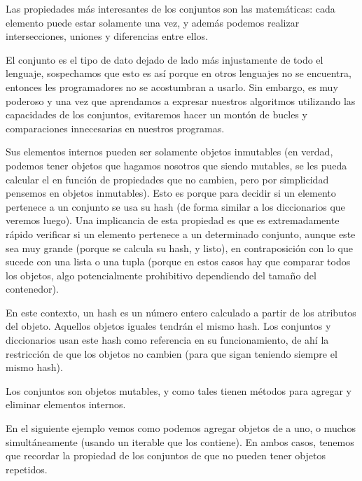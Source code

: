 Las propiedades más interesantes de los conjuntos son las matemáticas: cada elemento puede estar solamente una vez, y además podemos realizar intersecciones, uniones y diferencias entre ellos.


El conjunto es el tipo de dato dejado de lado más injustamente de todo el lenguaje, sospechamos que esto es así porque en otros lenguajes no se encuentra, entonces les programadores no se acostumbran a usarlo. Sin embargo, es muy poderoso y una vez que aprendamos a expresar nuestros algoritmos utilizando las capacidades de los conjuntos, evitaremos hacer un montón de bucles y comparaciones innecesarias en nuestros programas.

Sus elementos internos pueden ser solamente objetos inmutables (en verdad, podemos tener objetos que hagamos nosotros que siendo mutables, se les pueda calcular el  en función de propiedades que no cambien, pero por simplicidad pensemos en objetos inmutables). Esto es porque para decidir si un elemento pertenece a un conjunto se usa su hash (de forma similar a los diccionarios que veremos luego). Una implicancia de esta propiedad es que es extremadamente rápido verificar si un elemento pertenece a un determinado conjunto, aunque este sea muy grande (porque se calcula su hash, y listo), en contraposición con lo que sucede con una lista o una tupla (porque en estos casos hay que comparar todos los objetos, algo potencialmente prohibitivo dependiendo del tamaño del contenedor).

\begin{info}
En este contexto, un hash es un número entero calculado a partir de los atributos del objeto. Aquellos objetos iguales tendrán el mismo hash. Los conjuntos y diccionarios usan este hash como referencia en su funcionamiento, de ahí la restricción de que los objetos no cambien (para que sigan teniendo siempre el mismo hash).
\end{info}

Los conjuntos son objetos mutables, y como tales tienen métodos para agregar y eliminar elementos internos. 

En el siguiente ejemplo vemos como podemos agregar objetos de a uno, o muchos simultáneamente (usando un iterable que los contiene). En ambos casos, tenemos que recordar la propiedad de los conjuntos de que no pueden tener objetos repetidos.


